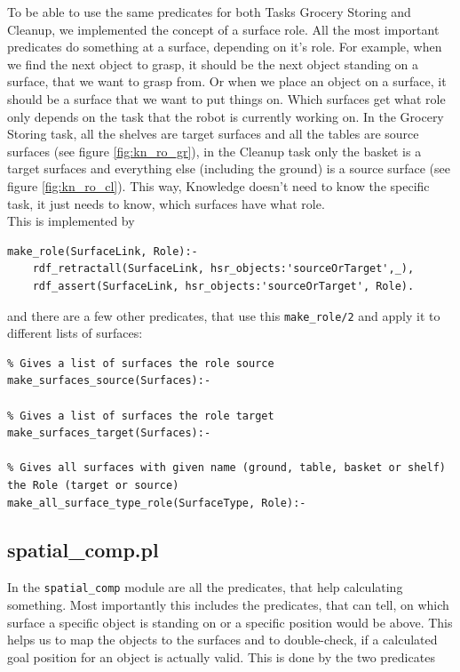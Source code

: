 \documentclass[main.tex]{subfiles}
\begin{document}
To be able to use the same predicates for both Tasks Grocery Storing and Cleanup, we implemented the concept of a surface role. All the most important predicates do something at a surface, depending on it's role. For example, when we find the next object to grasp, it should be the next object standing on a surface, that we want to grasp from. Or when we place an object on a surface, it should be a surface that we want to put things on. Which surfaces get what role only depends on the task that the robot is currently working on. In the Grocery Storing task, all the shelves are target surfaces and all the tables are source surfaces (see figure \ref{fig:kn_ro_gr}), in the Cleanup task only the basket is a target surfaces and everything else (including the ground) is a source surface (see figure \ref{fig:kn_ro_cl}). This way, Knowledge doesn't need to know the specific task, it just needs to know, which surfaces have what role.\\
This is implemented by 

\begin{lstlisting}
make_role(SurfaceLink, Role):-
    rdf_retractall(SurfaceLink, hsr_objects:'sourceOrTarget',_),
    rdf_assert(SurfaceLink, hsr_objects:'sourceOrTarget', Role).
\end{lstlisting}
and there are a few other predicates, that use this \texttt{make\_role/2} and apply it to different lists of surfaces:
\begin{lstlisting}
% Gives a list of surfaces the role source
make_surfaces_source(Surfaces):-

% Gives a list of surfaces the role target
make_surfaces_target(Surfaces):-

% Gives all surfaces with given name (ground, table, basket or shelf) the Role (target or source)
make_all_surface_type_role(SurfaceType, Role):-
\end{lstlisting}


\subsection{spatial\_comp.pl}

In the \texttt{spatial\_comp} module are all the predicates, that help calculating something. Most importantly this includes the predicates, that can tell, on which surface a specific object is standing on or a specific position would be above. This helps us to map the objects to the surfaces and to double-check, if a calculated goal position for an object is actually valid. This is done by the two predicates
\end{document}
